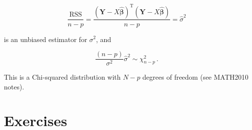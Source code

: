 \documentclass[
]{book}
\theoremstyle{definition}
\theoremstyle{definition}
\theoremstyle{definition}
\theoremstyle{definition}
\theoremstyle{remark}
\begin{document}
\begin{equation*}
\frac{\textrm{RSS}}{n-p}=\frac{(\boldsymbol{Y}-X\hat{\boldsymbol{\beta}})^{\textrm{T}}(\boldsymbol{Y}-X\hat{\boldsymbol{\beta}})}{n-p}=\hat{\sigma}^{2}
\end{equation*}

is an unbiased estimator for \(\sigma^{2}\), and

\begin{equation*}
\frac{(n-p)}{\sigma^{2}}\hat{\sigma}^{2}\sim\chi^{2}_{n-p}\,.
\end{equation*}

This is a Chi-squared distribution with \(N-p\) degrees of freedom (see MATH2010 notes).

\hypertarget{exercises}{%
\section{Exercises}\label{exercises}}
\end{document}
